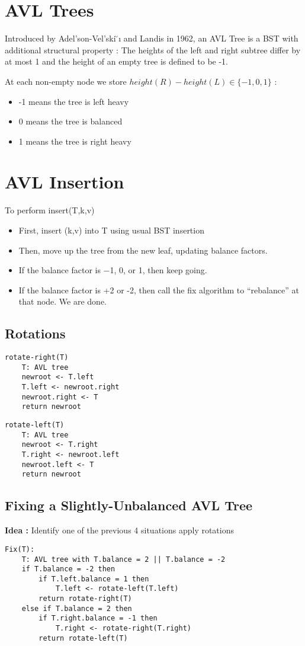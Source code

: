 \documentclass{article}
\begin{document}
\section{AVL Trees}
Introduced by Adel’son-Vel’ski ̆ı and Landis in 1962, an AVL Tree is a BST with additional structural property : The heights of the left and right subtree differ by at most 1 and the height of an empty tree is defined to be -1.

At each non-empty node we store \(height(R) - height(L) \in \{-1, 0, 1\} \) : 
\begin{itemize}
\item -1 means the tree is left heavy 
\item  0 means the tree is balanced
\item 1 means the tree is right heavy 
\end{itemize}

\section{AVL Insertion}
To perform insert(T,k,v) 
\begin{itemize}
\item First, insert (k,v) into T using usual BST insertion
\item Then, move up the tree from the new leaf, updating balance factors.
\item If the balance factor is −1, 0, or 1, then keep going.
\item If the balance factor is  +2 or -2, then call the fix algorithm to “rebalance” at that node. We are done.
\end{itemize}

\subsection{Rotations}
\begin{lstlisting}
rotate-right(T)
	T: AVL tree
	newroot <- T.left
	T.left <- newroot.right
	newroot.right <- T
	return newroot
\end{lstlisting}

\begin{lstlisting}
rotate-left(T)
	T: AVL tree
	newroot <- T.right
	T.right <- newroot.left
	newroot.left <- T
	return newroot
\end{lstlisting}

\subsection{Fixing a Slightly-Unbalanced AVL Tree}
\textbf{Idea : } Identify one of the previous 4 situations apply rotations
\begin{lstlisting}
Fix(T):
	T: AVL tree with T.balance = 2 || T.balance = -2
	if T.balance = -2 then 
		if T.left.balance = 1 then 
			T.left <- rotate-left(T.left)
		return rotate-right(T)
	else if T.balance = 2 then 
		if T.right.balance = -1 then 
			T.right <- rotate-right(T.right)
		return rotate-left(T)
\end{lstlisting}
\end{document}
